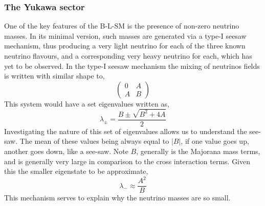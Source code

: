 \subsubsection{The Yukawa sector}

One of the key features of the B-L-SM is the presence of non-zero neutrino masses. In its minimal version, such masses are generated via a type-I seesaw mechanism, thus producing a very light neutrino for each of the three known neutrino flavours, and a corresponding very heavy neutrino for each, which has yet to be observed. In the type-I seesaw mechanism the mixing of neutrinos fields is written with similar shape to, 
\begin{equation}
\begin{pmatrix}
0 & A \\
A & B 
\end{pmatrix}
\end{equation}
This system would have a set eigenvalues written as, 
\begin{equation}
\lambda_\pm = \frac{ B \pm \sqrt{B^2 + 4 A} }{ 2 } 
\end{equation}
Investigating the nature of this set of eigenvalues allows us to understand the see-saw. The mean of these values being always equal to $|B|$, if one value goes up, another goes down, like a see-saw. Note $B$, generally is the Majorana mass terms, and is generally very large in comparison to the cross interaction terms. Given this the smaller eigenstate to be approximate, 
\begin{equation}
\lambda_- \approx \frac{A^2}{B}
\end{equation}
This mechanism serves to explain why the neutrino masses are so small. 

